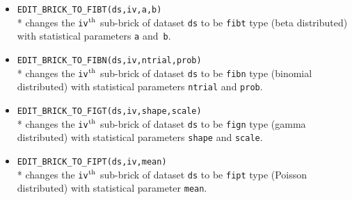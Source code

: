 \begin{itemize}
 \item {\tt EDIT\_BRICK\_TO\_FIBT(ds,iv,a,b)} \\*
  changes the {\tt iv}$^{\rm th}$ sub-brick of dataset {\tt ds}
  to be {\tt fibt} type (beta distributed) with statistical parameters {\tt a} and~{\tt b}.

 \item {\tt EDIT\_BRICK\_TO\_FIBN(ds,iv,ntrial,prob)} \\*
  changes the {\tt iv}$^{\rm th}$ sub-brick of dataset {\tt ds}
  to be {\tt fibn} type (binomial distributed) with statistical parameters {\tt ntrial} and {\tt prob}.

 \item {\tt EDIT\_BRICK\_TO\_FIGT(ds,iv,shape,scale)} \\*
  changes the {\tt iv}$^{\rm th}$ sub-brick of dataset {\tt ds}
  to be {\tt fign} type (gamma distributed) with statistical parameters {\tt shape} and {\tt scale}.

 \item {\tt EDIT\_BRICK\_TO\_FIPT(ds,iv,mean)} \\*
  changes the {\tt iv}$^{\rm th}$ sub-brick of dataset {\tt ds}
  to be {\tt fipt} type (Poisson distributed) with statistical parameter {\tt mean}.

\end{itemize}

